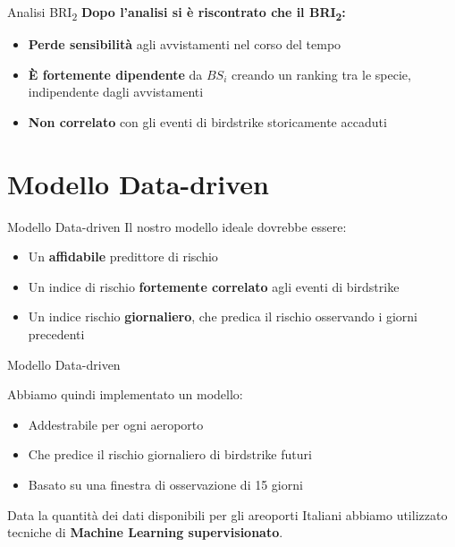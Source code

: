 \documentclass[10pt]{beamer}
\begin{document}
\begin{frame}{Analisi BRI\textsubscript{2}}
\textbf{Dopo l'analisi si è riscontrato che il BRI\textsubscript{2}:}
\begin{itemize}
    \item \textbf{Perde sensibilità} agli avvistamenti nel corso del tempo
    \item \textbf{\`E fortemente dipendente} da $BS_i$ creando un ranking tra le specie, indipendente dagli avvistamenti
    \item \textbf{Non correlato} con gli eventi di birdstrike storicamente accaduti
\end{itemize}
\end{frame}

\section{Modello Data-driven}

\begin{frame}{Modello Data-driven}
Il nostro modello ideale dovrebbe essere:
\begin{itemize}
    \item Un \textbf{affidabile} predittore di rischio
    \item Un indice di rischio \textbf{fortemente correlato} agli eventi di birdstrike
    \item Un indice rischio \textbf{giornaliero}, che predica il rischio osservando i giorni precedenti
\end{itemize}
\end{frame}

\begin{frame}{Modello Data-driven}

Abbiamo quindi implementato un modello:
\begin{itemize}
    \item Addestrabile per ogni aeroporto
    \item Che predice il rischio giornaliero di birdstrike futuri
    \item Basato su una finestra di osservazione di 15 giorni
\end{itemize}

Data la quantità dei dati disponibili per gli areoporti Italiani
abbiamo utilizzato tecniche di \textbf{Machine Learning supervisionato}.

\end{frame}
\end{document}
